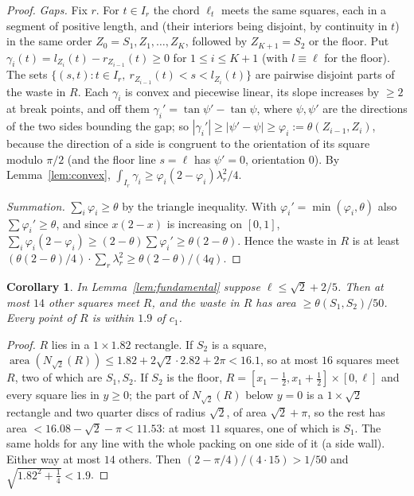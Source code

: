 \documentclass[11pt,letterpaper]{amsart}
\theoremstyle{plain}
\newtheorem{corollary}[theorem]{Corollary}
\theoremstyle{definition}
\theoremstyle{remark}
\begin{document}
\begin{proof}
\emph{Gaps.} Fix $r$. For $t\in I_r$ the chord $\ell_t$ meets the same squares, each in a segment of positive length, and (their interiors being disjoint, by continuity in $t$) in the same order $Z_0=S_1,Z_1,\ldots,Z_K$, followed by $Z_{K+1}=S_2$ or the floor. Put $\gamma_i(t)=l_{Z_i}(t)-r_{Z_{i-1}}(t)\ge0$ for $1\le i\le K+1$ (with $l\equiv\ell$ for the floor). The sets $\{(s,t):t\in I_r,\ r_{Z_{i-1}}(t)<s<l_{Z_i}(t)\}$ are pairwise disjoint parts of the waste in $R$. Each $\gamma_i$ is convex and piecewise linear, its slope increases by $\ge2$ at break points, and off them $\gamma_i'=\tan\psi'-\tan\psi$, where $\psi,\psi'$ are the directions of the two sides bounding the gap; so $|\gamma_i'|\ge|\psi'-\psi|\ge\varphi_i:=\theta(Z_{i-1},Z_i)$, because the direction of a side is congruent to the orientation of its square modulo $\pi/2$ (and the floor line $s=\ell$ has $\psi'=0$, orientation $0$). By Lemma~\ref{lem:convex}, $\int_{I_r}\gamma_i\ge\varphi_i(2-\varphi_i)\lambda_r^2/4$.

\emph{Summation.} $\sum_i\varphi_i\ge\theta$ by the triangle inequality. With $\varphi_i'=\min(\varphi_i,\theta)$ also $\sum\varphi_i'\ge\theta$, and since $x(2-x)$ is increasing on $[0,1]$, $\sum_i\varphi_i(2-\varphi_i)\ge(2-\theta)\sum\varphi_i'\ge\theta(2-\theta)$. Hence the waste in $R$ is at least $(\theta(2-\theta)/4)\cdot\sum_r\lambda_r^2\ge\theta(2-\theta)/(4q)$.
\end{proof}

\begin{corollary}\label{cor:local}
In Lemma~\ref{lem:fundamental} suppose $\ell\le\sqrt2+2/5$. Then at most $14$ other squares meet $R$, and the waste in $R$ has area $\ge\theta(S_1,S_2)/50$. Every point of $R$ is within $1.9$ of $c_1$.
\end{corollary}
\begin{proof}
$R$ lies in a $1\times1.82$ rectangle. If $S_2$ is a square, $\operatorname{area}(N_{\sqrt2}(R))\le1.82+2\sqrt2\cdot2.82+2\pi<16.1$, so at most $16$ squares meet $R$, two of which are $S_1,S_2$. If $S_2$ is the floor, $R=[x_1-\tfrac12,x_1+\tfrac12]\times[0,\ell]$ and every square lies in $y\ge0$; the part of $N_{\sqrt2}(R)$ below $y=0$ is a $1\times\sqrt2$ rectangle and two quarter discs of radius $\sqrt2$, of area $\sqrt2+\pi$, so the rest has area $<16.08-\sqrt2-\pi<11.53$: at most $11$ squares, one of which is $S_1$. The same holds for any line with the whole packing on one side of it (a side wall). Either way at most $14$ others. Then $(2-\pi/4)/(4\cdot15)>1/50$ and $\sqrt{1.82^2+\tfrac14}<1.9$.
\end{proof}
\end{document}
